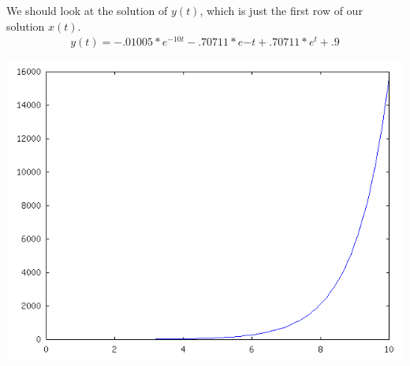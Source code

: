 \documentclass[11pt]{article}
\begin{document}
We should look at the solution of $y(t)$, which is just
the first row of our solution $x(t)$.
\begin{align*}
    y(t) = -.01005*e^{-10t}-.70711*e{-t}+.70711*e^{t}+.9
\end{align*}

\begin{center}
\includegraphics[scale=0.5]{problem_19_17.png}
\end{center}
\end{document}
